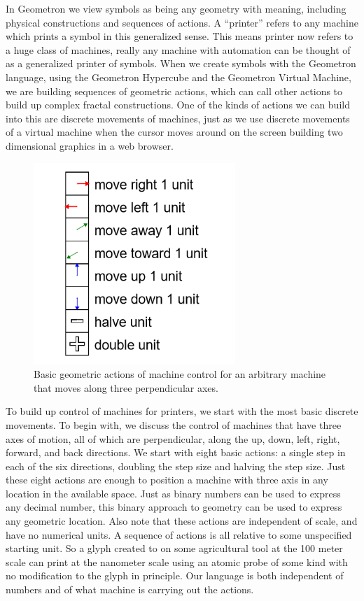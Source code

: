 
In Geometron we view symbols as being any geometry with meaning, including physical constructions and sequences of actions.  A ``printer'' refers to any machine which prints a symbol in this generalized sense.  This means printer now refers to a huge class of machines, really any machine with automation can be thought of as a generalized printer of symbols.  When we create symbols with the Geometron language, using the Geometron Hypercube and the Geometron Virtual Machine, we are building sequences of geometric actions, which can call other actions to build up complex fractal constructions.  One of the kinds of actions we can build into this are discrete movements of machines, just as we use discrete movements of a virtual machine when the cursor moves around on the screen building two dimensional graphics in a web browser.

\begin{figure}
	\centering
	\includegraphics[width=3in]{figures/machines/basicmovements.png}
	\caption[basicmovements]
	{Basic geometric actions of machine control for an arbitrary machine that moves along three perpendicular axes.}
\end{figure}

To build up control of machines for printers, we start with the most basic discrete movements.  To begin with, we discuss the control of machines that have three axes of motion, all of which are perpendicular, along the up, down, left, right, forward, and back directions.  We start with eight basic actions: a single step in each of the six directions, doubling the step size and halving the step size.  Just these eight actions are enough to position a machine with three axis in any location in the available space.  Just as binary numbers can be used to express any decimal number, this binary approach to geometry can be used to express any geometric location.  Also note that these actions are independent of scale, and have no numerical units.  A sequence of actions is all relative to some unspecified starting unit. So a glyph created to on some agricultural tool at the 100 meter scale can print at the nanometer scale using an atomic probe of some kind with no modification to the glyph in principle.  Our language is both independent of numbers and of what machine is carrying out the actions.   

